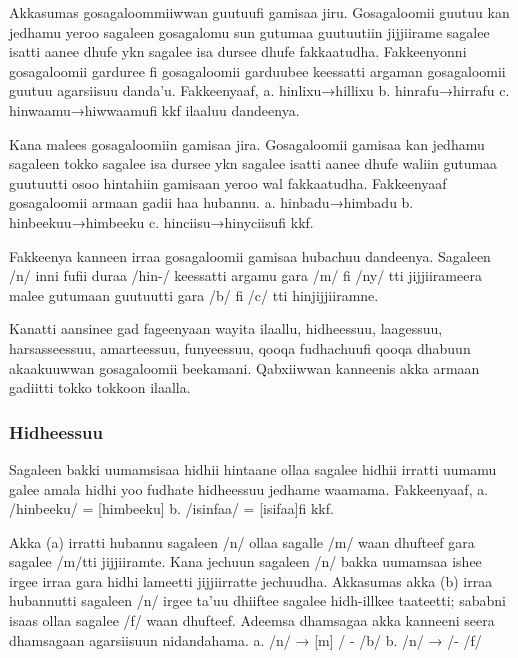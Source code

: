 \documentclass[11pt,b5paper]{book}
\begin{document}
\begin{itemize}
Akkasumas gosagaloommiiwwan guutuufi gamisaa jiru. Gosagaloomii  guutuu kan jedhamu yeroo sagaleen gosagalomu sun gutumaa  guutuutiin jijjiirame sagalee isatti aanee dhufe ykn sagalee isa  dursee dhufe fakkaatudha. Fakkeenyonni gosagaloomii  garduree fi gosagaloomii garduubee keessatti argaman  gosagaloomii guutuu agarsiisuu danda’u. Fakkeenyaaf,\newline
a. hinlixu→hillixu\newline  
b. hinrafu→hirrafu\newline  
c. hinwaamu→hiwwaamufi kkf ilaaluu dandeenya.

Kana malees gosagaloomiin gamisaa jira. Gosagaloomii gamisaa  kan jedhamu sagaleen tokko sagalee isa dursee ykn sagalee  isatti aanee dhufe waliin gutumaa guutuutti osoo hintahiin  gamisaan yeroo wal fakkaatudha. Fakkeenyaaf gosagaloomii  armaan gadii haa hubannu.\newline
a. hinbadu→himbadu\newline
b. hinbeekuu→himbeeku\newline  
c. hinciisu→hinyciisufi kkf.

Fakkeenya kanneen irraa gosagaloomii gamisaa hubachuu  dandeenya. Sagaleen /n/ inni fufii duraa /hin-/ keessatti  argamu gara /m/ fi /ny/ tti jijjiirameera malee gutumaan  guutuutti gara /b/ fi /c/ tti hinjijjiiramne.

Kanatti aansinee gad fageenyaan wayita ilaallu, hidheessuu, laagessuu,  harsasseessuu, amarteessuu, funyeessuu, qooqa fudhachuufi qooqa dhabuun akaakuuwwan gosagaloomii beekamani. Qabxiiwwan kanneenis akka armaan gadiitti tokko  tokkoon ilaalla.  

\subsubsection{Hidheessuu}

Sagaleen bakki uumamsisaa hidhii hintaane ollaa sagalee hidhii  irratti uumamu galee amala hidhi yoo fudhate hidheessuu  jedhame waamama. Fakkeenyaaf,\newline
a. /hinbeeku/ = [himbeeku]\newline  
b. /isinfaa/ = [isifaa]fi kkf.

Akka (a) irratti hubannu sagaleen /n/ ollaa sagalle /m/ waan  dhufteef gara sagalee /m/tti jijjiiramte. Kana jechuun  sagaleen /n/ bakka uumamsaa ishee irgee irraa gara hidhi  lameetti jijjiirratte jechuudha. Akkasumas akka (b) irraa  hubannutti sagaleen /n/ irgee ta’uu dhiiftee sagalee hidh-illkee  taateetti; sababni isaas ollaa sagalee /f/ waan dhufteef.  Adeemsa dhamsagaa akka kanneeni seera dhamsagaan  agarsiisuun nidandahama.\newline
a. /n/ → [m] / - /b/  \newline
b. /n/ → \textipa{[M]}/- /f/  


\end{itemize}
\end{document}
